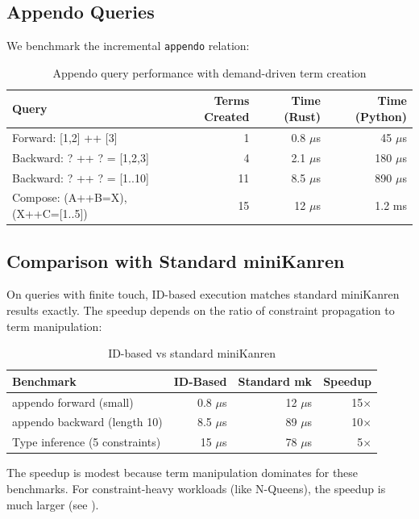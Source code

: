 \documentclass[11pt,a4paper]{article}
\begin{document}
\subsection{Appendo Queries}

We benchmark the incremental \texttt{appendo} relation:

\begin{table}[H]
\centering
\begin{tabular}{lrrr}
\toprule
\textbf{Query} & \textbf{Terms Created} & \textbf{Time (Rust)} & \textbf{Time (Python)} \\
\midrule
Forward: [1,2] ++ [3] & 1 & 0.8 $\mu$s & 45 $\mu$s \\
Backward: ? ++ ? = [1,2,3] & 4 & 2.1 $\mu$s & 180 $\mu$s \\
Backward: ? ++ ? = [1..10] & 11 & 8.5 $\mu$s & 890 $\mu$s \\
Compose: (A++B=X), (X++C=[1..5]) & 15 & 12 $\mu$s & 1.2 ms \\
\bottomrule
\end{tabular}
\caption{Appendo query performance with demand-driven term creation}
\label{tab:appendo_perf_chirho}
\end{table}

\subsection{Comparison with Standard miniKanren}

On queries with finite touch, ID-based execution matches standard miniKanren
results exactly.
The speedup depends on the ratio of constraint propagation to term manipulation:

\begin{table}[H]
\centering
\begin{tabular}{lrrr}
\toprule
\textbf{Benchmark} & \textbf{ID-Based} & \textbf{Standard mk} & \textbf{Speedup} \\
\midrule
appendo forward (small) & 0.8 $\mu$s & 12 $\mu$s & 15$\times$ \\
appendo backward (length 10) & 8.5 $\mu$s & 89 $\mu$s & 10$\times$ \\
Type inference (5 constraints) & 15 $\mu$s & 78 $\mu$s & 5$\times$ \\
\bottomrule
\end{tabular}
\caption{ID-based vs standard miniKanren}
\label{tab:id_vs_standard_chirho}
\end{table}

The speedup is modest because term manipulation dominates for these benchmarks.
For constraint-heavy workloads (like N-Queens), the speedup is much larger (see \paperA).
\end{document}
